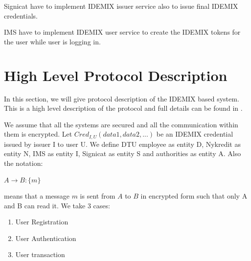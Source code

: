 Signicat have to implement IDEMIX issuer service also to issue final IDEMIX credentials.

IMS have to implement IDEMIX user service to create the IDEMIX tokens for the user while user is logging in.
\section{High Level Protocol Description}
In this section, we will give protocol description of the IDEMIX based system. This is a high level description of the protocol and full details can be found in \cite{camenisch2001efficient}.

We assume that all the systems are secured and all the communication within them is encrypted. Let $Cred_{I,U}(data1,data2,...)$ be an IDEMIX credential issued by issuer I to user U. We define DTU employee as entity D, Nykredit as entity N, IMS as entity I, Signicat as entity S and authorities as entity A. Also the notation:
\begin{center}
$A \rightarrow B : \{m\}$
\end{center}
means that a message $m$ is sent from $A$ to $B$ in encrypted form such that only A and B can read it.
We take 3 cases:

\begin{enumerate}
\item User Registration
\item User Authentication
\item User transaction
\end{enumerate}
	
